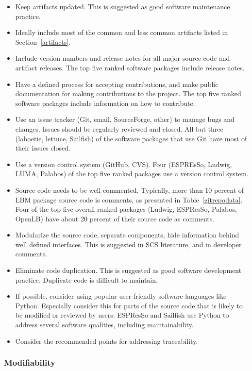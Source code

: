 \documentclass[final, 3p, times, authoryear]{elsarticle}
\begin{document}
\begin{itemize}
	\item Keep artifacts updated. This is suggested as good software maintenance practice.
	\item Ideally include most of the common and less common artifacts listed in Section~\ref{artifacts}.
	\item Include version numbers and release notes for all major source code and artifact releases. The top five ranked software packages include release notes.
	\item Have a defined process for accepting contributions, and make public documentation for making contributions to the project. The top five ranked software packages include information on how to contribute. 
	\item Use an issue tracker (Git, email, SourceForge, other) to manage bugs and changes. Issues should be regularly reviewed and closed. All but three (laboetie, lettuce, Sailfish) of the software packages that use Git have most of their issues closed.
	\item Use a version control system (GitHub, CVS). Four (ESPREsSo, Ludwig, LUMA, Palabos) of the top five ranked packages use a version control system.
	\item Source code needs to be well commented. Typically, more than 10 percent of LBM package source code is comments, as presented in Table~\ref{gitrepodata}. Four of the top five overall ranked packages (Ludwig, ESPResSo, Palabos, OpenLB) have about 20 percent of their source code as comments.
	\item Modularize the source code, separate components, hide information behind well defined interfaces. This is suggested in SCS literature, and in developer comments.
	\item Eliminate code duplication. This is suggested as good software development practice. Duplicate code is difficult to maintain.
	\item If possible, consider using popular user-friendly software languages like Python. Especially consider this for parts of the source code that is likely to be modified or reviewed by users. ESPResSo and Sailfish use Python to address several software qualities, including maintainability.
	\item Consider the recommended points for addressing traceability.
\end{itemize}

\subsubsection{Modifiability}
\end{document}

